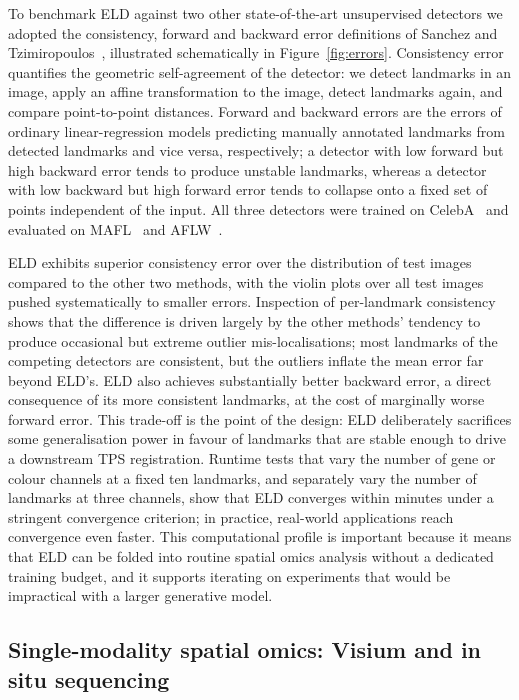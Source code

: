 \documentclass[11pt]{article}
\begin{document}
To benchmark ELD against two other state-of-the-art unsupervised detectors we adopted the consistency, forward and backward error definitions of Sanchez and Tzimiropoulos~\cite{sanchez2019object}, illustrated schematically in Figure~\ref{fig:errors}. Consistency error quantifies the geometric self-agreement of the detector: we detect landmarks in an image, apply an affine transformation to the image, detect landmarks again, and compare point-to-point distances. Forward and backward errors are the errors of ordinary linear-regression models predicting manually annotated landmarks from detected landmarks and vice versa, respectively; a detector with low forward but high backward error tends to produce unstable landmarks, whereas a detector with low backward but high forward error tends to collapse onto a fixed set of points independent of the input. All three detectors were trained on CelebA~\cite{liu2015celeba} and evaluated on MAFL~\cite{zhang2016learning} and AFLW~\cite{kostinger2011aflw}.

ELD exhibits superior consistency error over the distribution of test images compared to the other two methods, with the violin plots over all test images pushed systematically to smaller errors. Inspection of per-landmark consistency shows that the difference is driven largely by the other methods' tendency to produce occasional but extreme outlier mis-localisations; most landmarks of the competing detectors are consistent, but the outliers inflate the mean error far beyond ELD's. ELD also achieves substantially better backward error, a direct consequence of its more consistent landmarks, at the cost of marginally worse forward error. This trade-off is the point of the design: ELD deliberately sacrifices some generalisation power in favour of landmarks that are stable enough to drive a downstream TPS registration. Runtime tests that vary the number of gene or colour channels at a fixed ten landmarks, and separately vary the number of landmarks at three channels, show that ELD converges within minutes under a stringent convergence criterion; in practice, real-world applications reach convergence even faster. This computational profile is important because it means that ELD can be folded into routine spatial omics analysis without a dedicated training budget, and it supports iterating on experiments that would be impractical with a larger generative model.

\subsection{Single-modality spatial omics: Visium and in situ sequencing}
\end{document}
